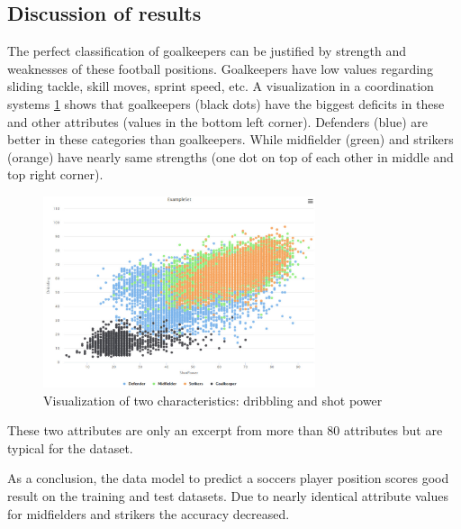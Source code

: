 \subsection{Discussion of results}
\label{sec:DiscussionResults}
The perfect classification of goalkeepers can be justified by strength and weaknesses of these football positions. Goalkeepers have low values regarding sliding tackle, skill moves, sprint speed, etc. A visualization in a coordination systems \ref{fig:VisualAttributes} shows that goalkeepers (black dots) have the biggest deficits in these and other attributes (values in the bottom left corner). Defenders (blue) are better in these categories than goalkeepers. While midfielder (green) and strikers (orange) have nearly same strengths (one dot on top of each other in middle and top right corner). 

\begin{figure}
\centering
  \includegraphics[width=8cm]{VisualizationAttributes.jpg}
  \caption{Visualization of two characteristics: dribbling and shot power}
  \label{fig:VisualAttributes}
\end{figure}

These two attributes are only an excerpt from more than 80 attributes but are typical for the dataset. 

As a conclusion, the data model to predict a soccers player position scores good result on the training and test datasets. Due to nearly identical attribute values for midfielders and strikers the accuracy decreased.